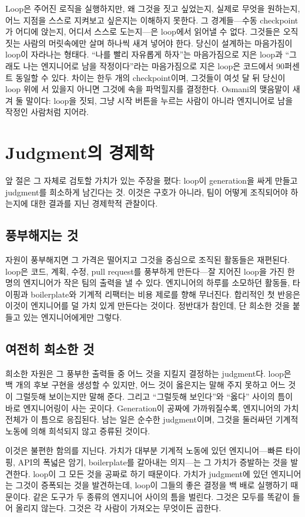 \documentclass[conference]{IEEEtran}
\begin{document}
Loop은 주어진 로직을 실행하지만, 왜 그것을 짓고 싶었는지, 실제로 무엇을 원하는지, 어느 지점을 스스로 지켜보고 싶은지는 이해하지 못한다. 그 경계들---수동 checkpoint가 어디에 앉는지, 어디서 스스로 도는지---은 loop에서 읽어낼 수 없다. 그것들은 오직 짓는 사람의 머릿속에만 살며 하나씩 새겨 넣어야 한다. 당신이 설계하는 마음가짐이 loop이 자라나는 형태다. ``나를 빨리 자유롭게 하자''는 마음가짐으로 지은 loop과 ``그래도 나는 엔지니어로 남을 작정이다''라는 마음가짐으로 지은 loop은 코드에서 90퍼센트 동일할 수 있다. 차이는 한두 개의 checkpoint이며, 그것들이 여섯 달 뒤 당신이 loop 위에 서 있을지 아니면 그것에 속을 파먹힐지를 결정한다. Osmani의 맺음말이 새겨 둘 말이다: loop을 짓되, 그냥 시작 버튼을 누르는 사람이 아니라 엔지니어로 남을 작정인 사람처럼 지어라.

\section{Judgment의 경제학}
앞 절은 그 자체로 검토할 가치가 있는 주장을 폈다: loop이 generation을 싸게 만들고 judgment를 희소하게 남긴다는 것. 이것은 구호가 아니라, 팀이 어떻게 조직되어야 하는지에 대한 결과를 지닌 경제학적 관찰이다.

\subsection{풍부해지는 것}
자원이 풍부해지면 그 가격은 떨어지고 그것을 중심으로 조직된 활동들은 재편된다. loop은 코드, 계획, 수정, pull request를 풍부하게 만든다---잘 지어진 loop을 가진 한 명의 엔지니어가 작은 팀의 출력을 낼 수 있다. 엔지니어의 하루를 소모하던 활동들, 타이핑과 boilerplate와 기계적 리팩터는 비용 제로를 향해 무너진다. 합리적인 첫 반응은 이것이 엔지니어를 덜 가치 있게 만든다는 것이다. 정반대가 참인데, 단 희소한 것을 붙들고 있는 엔지니어에게만 그렇다.

\subsection{여전히 희소한 것}
희소한 자원은 그 풍부한 출력들 중 어느 것을 지킬지 결정하는 judgment다. loop은 백 개의 후보 구현을 생성할 수 있지만, 어느 것이 옳은지는 말해 주지 못하고 어느 것이 그럴듯해 보이는지만 말해 준다. 그리고 ``그럴듯해 보인다''와 ``옳다'' 사이의 틈이 바로 엔지니어링이 사는 곳이다. Generation이 공짜에 가까워질수록, 엔지니어의 가치 전체가 이 틈으로 응집된다. 남는 일은 순수한 judgment이며, 그것을 둘러싸던 기계적 노동에 의해 희석되지 않고 증류된 것이다.

이것은 불편한 함의를 지닌다. 가치가 대부분 기계적 노동에 있던 엔지니어---빠른 타이핑, API의 폭넓은 암기, boilerplate를 갈아내는 의지---는 그 가치가 증발하는 것을 발견한다. loop이 그 모든 것을 공짜로 하기 때문이다. 가치가 judgment에 있던 엔지니어는 그것이 증폭되는 것을 발견하는데, loop이 그들의 좋은 결정을 백 배로 실행하기 때문이다. 같은 도구가 두 종류의 엔지니어 사이의 틈을 벌린다. 그것은 모두를 똑같이 들어 올리지 않는다. 그것은 각 사람이 가져오는 무엇이든 곱한다.
\end{document}
